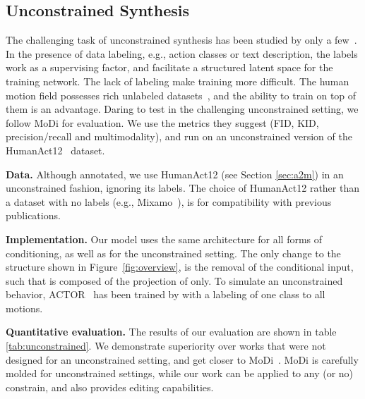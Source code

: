 \subsection{Unconstrained Synthesis} \label{sec:uncond}
\vspace{-5pt}
The challenging task of unconstrained synthesis has been studied by only a few~\citep{holden2016deep, raab2022modi}. 
In the presence of data labeling, e.g., action classes or text description, the labels work as a supervising factor, and facilitate a structured latent space for the training network. 
The lack of labeling make training more difficult.
The human motion field possesses rich unlabeled datasets~\citep{mixamo}, and the ability to train on top of them is an advantage.
Daring to test \ourmethod{} in the challenging unconstrained setting, we follow MoDi\citep{raab2022modi} for evaluation. We use the metrics they suggest (FID, KID, precision/recall and multimodality), and run on an unconstrained version of the HumanAct12~\citep{guo2020action2motion} dataset.

\textbf{Data.}
Although annotated, we use HumanAct12 (see Section \ref{sec:a2m}) in an unconstrained fashion, ignoring its labels. The choice of HumanAct12 rather than a dataset with no labels (e.g., Mixamo~\citep{mixamo}), is for compatibility with previous publications. 

\textbf{Implementation.}
Our model uses the same architecture for all forms of conditioning, as well as for the unconstrained setting.
The only change to the structure shown in Figure~\ref{fig:overview}, is the removal of the conditional input, such that  is composed of the projection of  only.
To simulate an unconstrained behavior, ACTOR~\citet{petrovich21actor} has been trained by \citep{raab2022modi} with a labeling of one class to all motions.


\textbf{Quantitative evaluation.}
The results of our evaluation are shown in table \ref{tab:unconstrained}.
We demonstrate superiority over works that were not designed for an unconstrained setting, and get closer to MoDi~\citep{raab2022modi}. MoDi is carefully molded for unconstrained settings, while our work can be applied to any (or no) constrain, and also provides editing capabilities.


